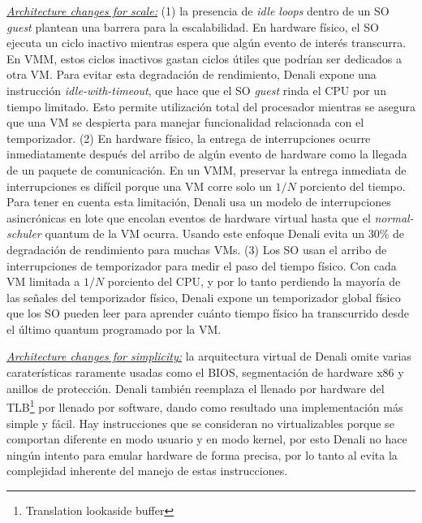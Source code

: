 \underline{\emph{Architecture changes for scale:}} (1) la presencia de \emph{idle loops} dentro de un SO \emph{guest} plantean una barrera para la escalabilidad. En hardware físico, el SO ejecuta un ciclo inactivo mientras espera que algún evento de interés transcurra. En VMM, estos ciclos inactivos gastan ciclos útiles que podrían ser dedicados a otra VM. Para evitar esta degradación de rendimiento, Denali expone una instrucción \emph{idle-with-timeout}, que hace que el SO \emph{guest} rinda el CPU por un tiempo limitado. Esto permite utilización total del procesador mientras se asegura que una VM se despierta para manejar funcionalidad relacionada con el temporizador. (2) En hardware físico, la entrega de interrupciones ocurre inmediatamente después del arribo de algún evento de hardware como la llegada de un paquete de comunicación. En un VMM, preservar la entrega inmediata de interrupciones es difícil porque una VM corre solo un $1/N$ porciento del tiempo. Para tener en cuenta esta limitación, Denali usa un modelo de interrupciones asincrónicas en lote que encolan eventos de hardware virtual hasta que el \emph{normal-schuler} quantum de la VM ocurra. Usando este enfoque Denali evita un 30\% de degradación de rendimiento para muchas VMs. (3) Los SO usan el arribo de interrupciones de temporizador para medir el paso del tiempo físico. Con cada VM limitada a $1/N$ porciento del CPU, y por lo tanto perdiendo la mayoría de las señales del temporizador físico, Denali expone un temporizador global físico que los SO pueden leer para aprender cuánto tiempo físico ha transcurrido desde el último quantum programado por la VM. 

\underline{\emph{Architecture changes for simplicity:}} la arquitectura virtual de Denali omite varias caraterísticas raramente usadas como el BIOS, segmentación de hardware x86 y anillos de protección. Denali también reemplaza el llenado por hardware del TLB\footnote{Translation lookaside buffer} por llenado por software, dando como resultado una implementación más simple y fácil. Hay instrucciones que se consideran no virtualizables porque se comportan diferente en modo usuario y en modo kernel, por esto Denali no hace ningún intento para emular hardware de forma precisa, por lo tanto al evita la complejidad inherente del manejo de estas instrucciones.

